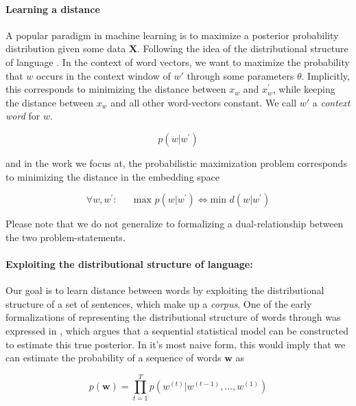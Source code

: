 \documentclass[a4paper,12pt,twoside,openright]{report}
\begin{document}
\paragraph{Learning a distance}
A popular paradigm in machine learning is to maximize a posterior probability distribution given some data $\mathbf{X}$.
Following the idea of the distributional structure of language \cite{harris54}.
In the context of word vectors, we want to maximize the probability that $w$ occurs in the context window of $w \prime$ through some parameters $\theta$.
Implicitly, this corresponds to minimizing the distance between $x_w$ and $x_w^{\prime}$, while keeping the distance between $x_w$ and all other word-vectors constant. 
We call $w \prime$ a \textit{context word} for $w$.

\begin{equation}
p \left(w | w^{\prime}\right)
\end{equation}

and in the work we focus at, the probabilistic maximization problem corresponds to minimizing the distance in the embedding space

\begin{equation}
\forall w, w^{\prime} : \hspace{20pt} \text{max } p \left(w | w^{\prime}\right) \iff \text{min } d(w | w^{\prime})
\end{equation}

Please note that we do not generalize to formalizing a dual-relationship between the two problem-statements.

\paragraph{Exploiting the distributional structure of language:} Our goal is to learn distance between words by exploiting the distributional structure of a set of sentences, which make up a \textit{corpus}. 
One of the early formalizations of representing the distributional structure of words through was expressed in \cite{bengio03}, which argues that a sequential statistical model can be constructed to estimate this true posterior.  
In it's most naive form, this would imply that we can estimate the probability of a sequence of words $\mathbf{w}$ as

\begin{equation}
p(\mathbf{w}) = \prod_{t=1}^T p\left( w^{(t)} | w^{(t -1)}, \ldots, w^{(1)} \right)
\end{equation}{\label{eq:naive_sequential_probability}}
\end{document}
